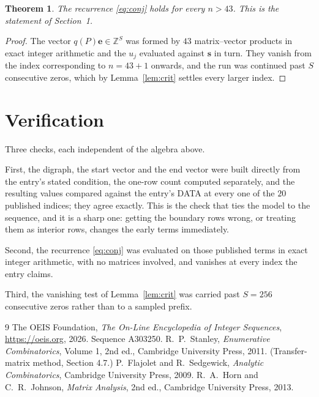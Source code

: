 \documentclass[11pt,a4paper]{article}
\theoremstyle{plain}
\newtheorem{theorem}{Theorem}
\theoremstyle{definition}
\begin{document}
\begin{theorem}
The recurrence \eqref{eq:conj} holds for every $n>43$. This is the statement of
Section~1.
\end{theorem}

\begin{proof}
The vector $q(P)\mathbf{e}\in\mathbb{Z}^{S}$ was formed by $43$ matrix--vector
products in exact integer arithmetic and the $u_j$ evaluated against $\mathbf{s}$ in turn.
They vanish from the index corresponding to $n=43+1$ onwards, and the run was continued
past $S$ consecutive zeros, which by Lemma~\ref{lem:crit} settles every larger index.
\end{proof}

\section{Verification}

Three checks, each independent of the algebra above.

First, the digraph, the start vector and the end vector were built directly from the
entry's stated condition, the one-row count computed separately, and the resulting values
compared against the entry's DATA at every one of the $20$ published indices; they
agree exactly. This is the check that ties the model to the sequence, and it is a sharp one:
getting the boundary rows wrong, or treating them as interior rows, changes the early terms
immediately.

Second, the recurrence \eqref{eq:conj} was evaluated on those published terms in exact
integer arithmetic, with no matrices involved, and vanishes at every index the entry claims.

Third, the vanishing test of Lemma~\ref{lem:crit} was carried past $S=256$ consecutive
zeros rather than to a sampled prefix.

\begin{thebibliography}{9}
 The OEIS Foundation, \emph{The On-Line Encyclopedia of Integer
Sequences}, \url{https://oeis.org}, 2026. Sequence A303250.
 R.~P.~Stanley, \emph{Enumerative Combinatorics}, Volume 1, 2nd ed.,
Cambridge University Press, 2011. (Transfer-matrix method, Section 4.7.)
 P.~Flajolet and R.~Sedgewick, \emph{Analytic Combinatorics}, Cambridge
University Press, 2009.
 R.~A.~Horn and C.~R.~Johnson, \emph{Matrix Analysis}, 2nd ed., Cambridge
University Press, 2013.
\end{thebibliography}
\end{document}
